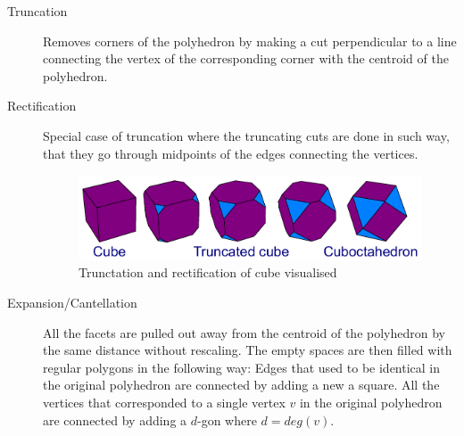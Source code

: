 \begin{description}
    \item[Truncation] Removes corners of the polyhedron by making a cut perpendicular to a line connecting the vertex of the corresponding corner with the centroid of the polyhedron.
    \item[Rectification] Special case of truncation where the truncating cuts are done in such way, that they go through midpoints of the edges connecting the vertices. 
    \begin{figure}[H]
        \centering
        \includegraphics[width=1\textwidth]{../Resources/Figs/op_truncation.pdf}
        \caption{Trunctation and rectification of cube visualised \cite{wikimedia-cube-truncation}}
        \label{fig:op_truncation}
    \end{figure}
    \item[Expansion/Cantellation] All the facets are pulled out away from the centroid of the polyhedron by the same distance without rescaling. The empty spaces are then filled with regular polygons in the following way: Edges that used to be identical in the original polyhedron are connected by adding a new a square. All the vertices that corresponded to a single vertex $v$ in the original polyhedron are connected by adding a $d$-gon where $d=deg(v)$.


\end{description}
